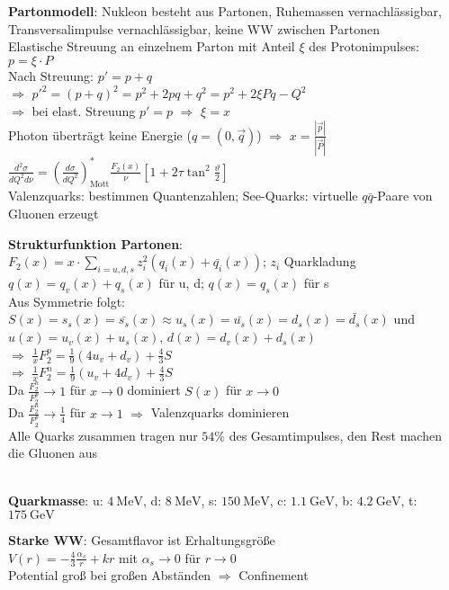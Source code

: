 \documentclass[10pt,twoside,a4paper]{article}
\begin{document}
\begin{multicols*}{3}
\textbf{Partonmodell}: Nukleon besteht aus Partonen, Ruhemassen vernachlässigbar, Transversalimpulse vernachlässigbar, keine WW zwischen Partonen \\
Elastische Streuung an einzelnem Parton mit Anteil $\xi$ des Protonimpulses: $p = \xi \cdot P$ \\
Nach Streuung: $p' = p + q$ \\
$\Rightarrow$ $p'^2 = (p + q)^2 = p^2 + 2 p q + q^2 = p^2 + 2 \xi P q - Q^2$ \\
$\Rightarrow$ bei elast. Streuung $p' = p$ $\Rightarrow$ $\xi = x$ \\
Photon überträgt keine Energie ($q = (0,\vec{q})$) $\Rightarrow$ $x = \frac{|\vec{p}|}{|\vec{P}|}$ \\
$\frac{d^2\sigma}{dQ^2 d\nu} = \left( \frac{d\sigma}{dQ^2} \right)^*_{\text{Mott}} \frac{F_2(x)}{\nu} \left[ 1 + 2\tau \tan^2 \frac{\vartheta}{2} \right]$ \\
Valenzquarks: bestimmen Quantenzahlen; See-Quarks: virtuelle $q\bar{q}$-Paare von Gluonen erzeugt

\textbf{Strukturfunktion Partonen}: \\
$F_2(x) = x \cdot \sum_{i=u,d,s} z^2_i (q_i(x) + \bar{q_i}(x))$; $z_i$ Quarkladung \\
$q(x) = q_v(x) + q_s(x)$ für u, d; $q(x) = q_s(x)$ für s \\
Aus Symmetrie folgt: $S(x) = s_s(x) = \bar{s_s}(x) \approx u_s(x) = \bar{u_s}(x) = d_s(x) = \bar{d_s}(x)$ und \\
$u(x) = u_v(x) + u_s(x)$, $d(x) = d_v(x) + d_s(x)$ \\
$\Rightarrow$ $\frac{1}{x} F^p_2 = \frac{1}{9} (4 u_v + d_v) + \frac{4}{3} S$ \\
$\Rightarrow$ $\frac{1}{x} F^n_2 = \frac{1}{9} (u_v + 4 d_v) + \frac{4}{3} S$ \\
Da $\frac{F^n_2}{F^p_2} \to 1$ für $x \to 0$ dominiert $S(x)$ für $x \to 0$ \\
Da $\frac{F^n_2}{F^p_2} \to \frac{1}{4}$ für $x \to 1$ $\Rightarrow$ Valenzquarks dominieren \\
Alle Quarks zusammen tragen nur $54\%$ des Gesamtimpulses, den Rest machen die Gluonen aus

\ \\
\textbf{Quarkmasse}: u: $\SI{4}{\mega\eV}$, d: $\SI{8}{\mega\eV}$, s: $\SI{150}{\mega\eV}$, c: $\SI{1.1}{\giga\eV}$, b: $\SI{4.2}{\giga\eV}$, t: $\SI{175}{\giga\eV}$

\textbf{Starke WW}: Gesamtflavor ist Erhaltungsgröße \\
$V(r) = - \frac{4}{3} \frac{\alpha_s}{r} + k r$ mit $\alpha_s \to 0$ für $r \to 0$ \\
Potential groß bei großen Abständen $\Rightarrow$ Confinement


\end{multicols*}
\end{document}
